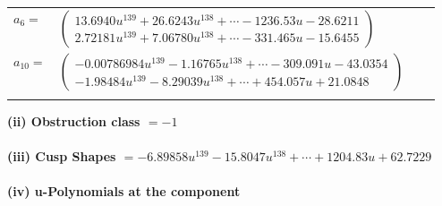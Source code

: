 \documentclass[1p]{elsarticle_modified}
\theoremstyle{definition}
\begin{document}
\begin{tabular}{m{7pt} m{180pt} m{7pt} m{180pt} }
\flushright $a_{6}=$&$\begin{pmatrix}13.6940 u^{139}+26.6243 u^{138}+\cdots-1236.53 u-28.6211\\2.72181 u^{139}+7.06780 u^{138}+\cdots-331.465 u-15.6455\end{pmatrix}$ \\
\flushright $a_{10}=$&$\begin{pmatrix}-0.00786984 u^{139}-1.16765 u^{138}+\cdots-309.091 u-43.0354\\-1.98484 u^{139}-8.29039 u^{138}+\cdots+454.057 u+21.0848\end{pmatrix}$\\&\end{tabular}
\flushleft \textbf{(ii) Obstruction class $= -1$}\\~\\
\flushleft \textbf{(iii) Cusp Shapes $= -6.89858 u^{139}-15.8047 u^{138}+\cdots+1204.83 u+62.7229$}\\~\\
\newpage\renewcommand{\arraystretch}{1}
\flushleft \textbf{(iv) u-Polynomials at the component}\newline \\
\end{document}
